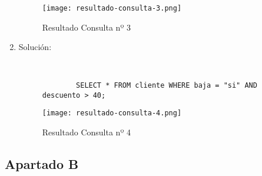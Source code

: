 \begin{enumerate}
    \begin{figure}[H]
        \centering
        \texttt{[image: resultado-consulta-3.png]}
        \caption{Resultado Consulta nº 3}
    \end{figure}

    \item Solución:

    \begin{figure}[H]
        \begin{tcolorbox}[sharp corners, colback=yellow!30, colframe=white!20]
            \scriptsize
            \begin{verbatim}


        SELECT * FROM cliente WHERE baja = "si" AND descuento > 40;
            \end{verbatim}
        \end{tcolorbox}
    \end{figure}

    \begin{figure}[H]
        \centering
        \texttt{[image: resultado-consulta-4.png]}
        \caption{Resultado Consulta nº 4}
    \end{figure}
\end{enumerate}

\subsection{Apartado B}

